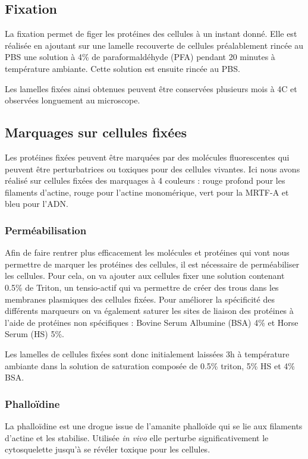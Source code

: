 \documentclass{report}
\begin{document}
	\subsection{Fixation}
	La fixation permet de figer les protéines des cellules à un instant donné. Elle est réalisée en ajoutant sur une lamelle recouverte de cellules préalablement rincée au PBS une solution à 4\% de paraformaldéhyde (PFA) pendant 20 minutes à température ambiante. Cette solution est ensuite rincée au PBS. 
	
	Les lamelles fixées ainsi obtenues peuvent être conservées plusieurs mois à 4\degres   C et observées longuement au microscope. 
	\subsection{Marquages sur cellules fixées}
	Les protéines fixées peuvent être marquées par des molécules fluorescentes qui peuvent être perturbatrices ou toxiques pour des cellules vivantes. Ici nous avons réalisé sur cellules fixées des marquages à 4 couleurs : rouge profond pour les filaments d'actine, rouge pour l'actine monomérique, vert pour la MRTF-A et bleu pour l'ADN. 
		\subsubsection{Perméabilisation}
		Afin de faire rentrer plus efficacement les molécules et protéines qui vont nous permettre de marquer les protéines des cellules, il est nécessaire de perméabiliser les cellules. Pour cela, on va ajouter aux cellules fixer une solution contenant 0.5\% de Triton, un tensio-actif qui va permettre de créer des trous dans les membranes plasmiques des cellules fixées. 
		Pour améliorer la spécificité des différents marqueurs on va également saturer les sites de liaison des protéines à l'aide de protéines non spécifiques : Bovine Serum Albumine (BSA) 4\% et Horse Serum (HS) 5\%. 
		
		Les lamelles de cellules fixées sont donc initialement laissées 3h à température ambiante dans la solution de saturation composée de 0.5\% triton, 5\% HS et 4\% BSA. 
		
		\subsubsection{Phalloïdine}
		La phalloïdine est une drogue issue de l'amanite phalloïde qui se lie aux filaments d'actine et les stabilise. Utilisée \emph{in vivo} elle perturbe significativement le cytosquelette jusqu'à se révéler toxique pour les cellules. 
		
\end{document}
